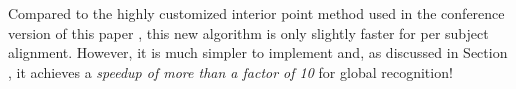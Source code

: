 
Compared to the highly customized interior point method used in the conference
version of this paper \cite{Wagner2009-CVPR}, this new algorithm is only
slightly faster for per subject alignment. However, it is much simpler to
implement and, as discussed in Section \label{sec:pipeline_implementation}, it
achieves a \emph{speedup of more than a factor of 10} for global recognition!
